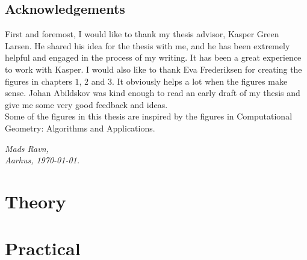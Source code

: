 \documentclass[twoside,11pt,openright]{report}
\begin{document}
\chapter*{Acknowledgements}

First and foremost, I would like to thank my thesis advisor, Kasper Green Larsen. He shared his idea for the thesis with me, and he has been extremely helpful and engaged in the process of my writing. It has been a great experience to work with Kasper.
I would also like to thank Eva Frederiksen for creating the figures in chapters $1$, $2$ and $3$. It obviously helps a lot when the figures make sense. Johan Abildskov was kind enough to read an early draft of my thesis and give me some very good feedback and ideas.\\

Some of the figures in this thesis are inspired by the figures in Computational Geometry: Algorithms and Applications\cite{compgeo}.

\vspace{2ex}
\begin{flushright}
  \emph{Mads Ravn,}\\
  \emph{Aarhus, \today.}
\end{flushright}

\tableofcontents
{}
\setcounter{secnumdepth}{2}





\part{Theory}




\part{Practical}







 

\end{document}
